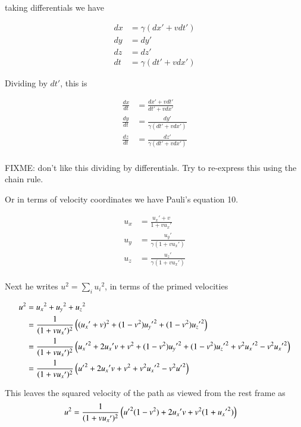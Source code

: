 taking differentials we have

\begin{align*}
dx &= \gamma ( dx' + v dt') \\
dy &= dy' \\
dz &= dz' \\
dt &= \gamma ( dt' + v dx')
\end{align*}

Dividing by $dt'$, this is

\begin{align*}
\frac{dx}{dt} &= \frac{ dx' + v dt' }{ dt' + v dx'} \\
\frac{dy}{dt} &= \frac{dy'}{\gamma (dt' + v dx')} \\
\frac{dz}{dt} &= \frac{dz'}{\gamma (dt' + v dx')} \\
\end{align*}

FIXME: don't like this dividing by differentials.  Try to re-express this 
using the chain rule.

Or in terms of velocity coordinates we have Pauli's equation 10.

\begin{align*}
u_x &= \frac{ {u_x}' + v  }{ 1 + v {u_x}'} \\
u_y &= \frac{{u_y}'}{\gamma (1 + v {u_x}')} \\
u_z &= \frac{{u_z}'}{\gamma (1 + v {u_x}')} \\
\end{align*}

Next he writes $u^2 = \sum_i {u_i}^2$, in terms of the primed velocities

\begin{align*}
u^2 &= {u_x}^2 +{u_y}^2 +{u_z}^2  \\
&=
\frac{1}{( 1 + v {u_x}' )^2 } \left(
( {u_x}' + v  )^2
+(1-v^2){{u_y}'}^2
+(1-v^2){{u_z}'}^2
\right) \\
&=
\frac{1}{( 1 + v {u_x}' )^2 } \left(
{{u_x}'}^2
+ 2 {u_x}' v
+ v^2
+(1-v^2){{u_y}'}^2
+(1-v^2){{u_z}'}^2
+v^2 {{u_x}'}^2
-v^2 {{u_x}'}^2
\right) \\
&=
\frac{1}{( 1 + v {u_x}' )^2 } \left(
{{u}'}^2
+ 2 {u_x}' v
+ v^2
+v^2 {{u_x}'}^2
-v^2 {{u}'}^2
\right) \\
\end{align*}

This leaves the squared velocity of the path as viewed from the rest frame as
\begin{align}\label{eqn:Usquare}
u^2 &=
\frac{1}{( 1 + v {u_x}' )^2 } \left(
{{u}'}^2(1-v^2)
+ 2 {u_x}' v
+v^2 (1 + {{u_x}'}^2)
\right)
\end{align}


